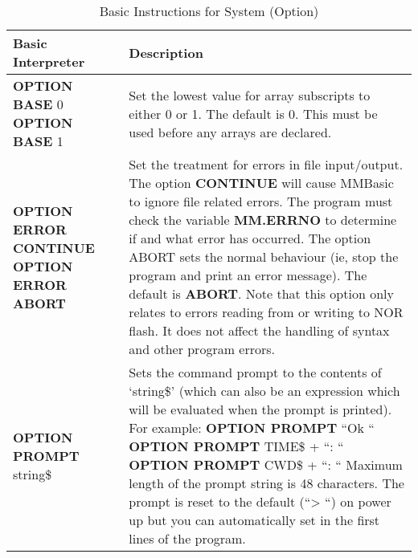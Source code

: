 \begin{table}[]
\centering
\caption{Basic Instructions for System (Option)}
\label{Basic_Instructions_for_System_Option}
\begin{tabular}{|p{4cm}|p{10cm}|}
\hline
\textbf{Basic Interpreter} & \textbf{Description}                                                   \\ \hline
\textbf{OPTION BASE} 0\newline
\textbf{OPTION BASE} 1
& Set the lowest value for array subscripts to either 0 or 1. The default is
0. This must be used before any arrays are declared.
\\ \hline
\textbf{OPTION ERROR CONTINUE}\newline
\textbf{OPTION ERROR ABORT}
 & Set the treatment for errors in file input/output. The option \textbf{CONTINUE}
will cause MMBasic to ignore file related errors. The program must
check the variable \textbf{MM.ERRNO} to determine if and what error has
occurred.\newline
The option ABORT sets the normal behaviour (ie, stop the program and
print an error message). The default is \textbf{ABORT}.\newline
Note that this option only relates to errors reading from or writing to
NOR flash. It does not affect the handling of syntax and other
program errors.
\\ \hline
\textbf{OPTION PROMPT} string\$ & Sets the command prompt to the contents of ‘string\$’ (which can also be an expression which will be evaluated when the prompt is printed).\newline
For example:\newline
\textbf{OPTION PROMPT} “Ok “\newline
\textbf{OPTION PROMPT} TIME\$ + “: “\newline
\textbf{OPTION PROMPT} CWD\$ + “: “\newline
Maximum length of the prompt string is 48 characters. The prompt is
reset to the default (“> “) on power up but you can automatically set in the first lines of the program.
\\ \hline
\end{tabular}
\end{table}

